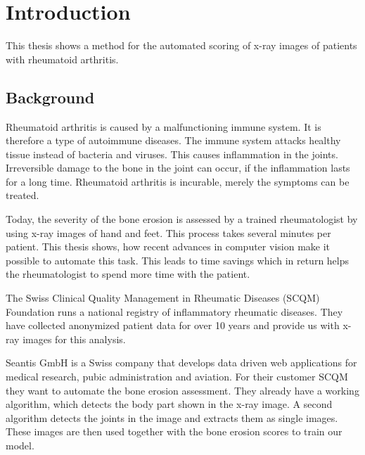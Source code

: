 \documentclass[12pt]{article}
\begin{document}
\newpage

\tableofcontents

\newpage

\section{Introduction}

This thesis shows a method for the automated scoring of x-ray images of patients with rheumatoid arthritis. 

\subsection{Background}

Rheumatoid arthritis is caused by a malfunctioning immune system. It is therefore a type of autoimmune diseases. The immune system attacks healthy tissue instead of bacteria and viruses. This causes inflammation in the joints. Irreversible damage to the bone in the joint can occur, if the inflammation lasts for a long time. \cite{rheuma} Rheumatoid arthritis is incurable, merely the symptoms can be treated.

Today, the severity of the bone erosion is assessed by a trained rheumatologist by using x-ray images of hand and feet. This process takes several minutes per patient. This thesis shows, how recent advances in computer vision make it possible to automate this task. This leads to time savings which in return helps the rheumatologist to spend more time with the patient.

The Swiss Clinical Quality Management in Rheumatic Diseases (SCQM) Foundation runs a national registry of inflammatory rheumatic diseases. \cite{scqm_about} They have collected anonymized patient data for over 10 years and provide us with x-ray images for this analysis.

Seantis GmbH is a Swiss company that develops data driven web applications for medical research, pubic administration and aviation. \cite{seantis_about} For their customer SCQM they want to automate the bone erosion assessment. They already have a working algorithm, which detects the body part shown in the x-ray image. A second algorithm detects the joints in the image and extracts them as single images. These images are then used together with the bone erosion scores to train our model.

\end{document}
